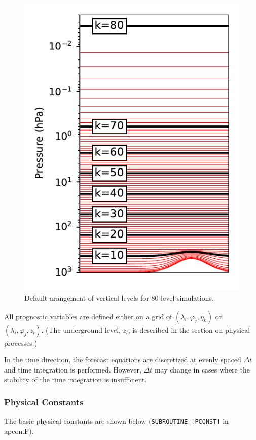 \begin{figure}
\centering
\includegraphics{levels.pdf}
\caption{Default arangement of vertical levels for 80-level
simulations.\label{levels}}
\end{figure}

All prognostic variables are defined either on a grid of
\((\lambda_i, \varphi_j, \eta_k)\) or \((\lambda_i, \varphi_j, z_l)\).
(The underground level, \(z_l\), is described in the section on physical
processes.)

In the time direction, the forecast equations are discretized at
evenly spaced \(\Delta t\) and time integration is performed.
However, \(\Delta t\) may change in cases where the stability of the time integration is insufficient.



\hypertarget{physical-constants}{%
\subsubsection{Physical Constants}\label{physical-constants}}

The basic physical constants are shown below
(\texttt{SUBROUTINE\ {[}PCONST{]}} in apcon.F).

